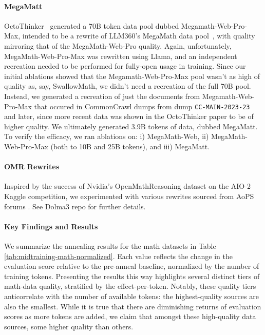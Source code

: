 \documentclass[table]{ai2style/ai2}
\begin{document}
{{\paragraph{MegaMatt}
OctoThinker~\citep{wang2025octothinker} generated a 70B token data pool dubbed Megamath-Web-Pro-Max, intended to be a rewrite of LLM360's MegaMath data pool~\citep{liu2023llm360}, with quality mirroring that of the MegaMath-Web-Pro quality. Again, unfortunately, MegaMath-Web-Pro-Max was rewritten using Llama, and an independent recreation needed to be performed for fully-open usage in training. Since our initial ablations showed that the Megamath-Web-Pro-Max pool wasn't as high of quality as, say, SwallowMath, we didn't need a recreation of the full 70B pool. Instead, we generated a recreation of just the documents from Megamath-Web-Pro-Max that occured in CommonCrawl dumps from dump \texttt{CC-MAIN-2023-23} and later, since more recent data was shown in the OctoThinker paper to be of higher quality. We ultimately generated 3.9B tokens of data, dubbed MegaMatt. To verify the efficacy, we ran ablations on: i) MegaMath-Web, ii) MegaMath-Web-Pro-Max (both to 10B and 25B tokens), and iii) MegaMatt.

\paragraph{OMR Rewrites}
Inspired by the success of Nvidia's OpenMathReasoning dataset on the AIO-2 Kaggle competition, we experimented with various rewrites sourced from AoPS forums \cite{moshkov2025aimo2}. See Dolma3 repo for further details.

\paragraph{Key Findings and Results} We summarize the annealing results for the math datasets in Table \ref{tab:midtraining-math-normalized}. Each value reflects the change in the evaluation score relative to the pre-anneal baseline, normalized by the number of training tokens. Presenting the results this way highlights several distinct tiers of math-data quality, stratified by the effect-per-token. Notably, these quality tiers anticorrelate with the number of available tokens: the highest-quality sources are also the smallest. While it is true that there are diminishing returns of evaluation scores as more tokens are added, we claim that amongst these high-quality data sources, some higher quality than others.

}}
\end{document}
